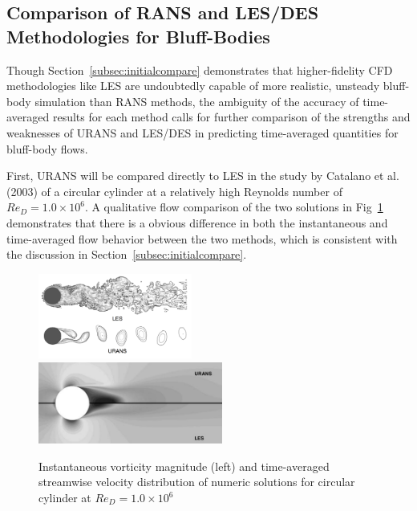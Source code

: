 \documentclass[journal]{new-aiaa}
\begin{document}
\subsection{Comparison of RANS and LES/DES Methodologies for Bluff-Bodies} \label{subsec:desvsrans}

Though Section~\ref{subsec:initialcompare} demonstrates that higher-fidelity CFD methodologies like LES are undoubtedly capable of more realistic, unsteady bluff-body simulation than RANS methods, the ambiguity of the accuracy of time-averaged results for each method calls for further comparison of the strengths and weaknesses of URANS and LES/DES in predicting time-averaged quantities for bluff-body flows.

First, URANS will be compared directly to LES in the study by Catalano et al. (2003) \cite{catalano2003numerical} of a circular cylinder at a relatively high Reynolds number of $Re_D = 1.0 \times 10^6$. A qualitative flow comparison of the two solutions in Fig~\ref{fig:cylinderransvslesflow} demonstrates that there is a obvious difference in both the instantaneous and time-averaged flow behavior between the two methods, which is consistent with the discussion in Section~\ref{subsec:initialcompare}.



\begin{figure}[H]
\begin{center}
\includegraphics[width=0.45\textwidth]{Images/logan/catalano_2003numerical_UnsteadyURANSvsLES.pdf}
\includegraphics[width=0.54\textwidth]{Images/logan/catalano_2003numerical_SteadyURANSvsLES.pdf}
\caption{ Instantaneous vorticity magnitude (left) and time-averaged streamwise velocity distribution of numeric solutions for circular cylinder at $Re_D = 1.0 \times 10^6$ \cite{catalano2003numerical} }
\label{fig:cylinderransvslesflow}
\end{center}
\end{figure}
\end{document}

